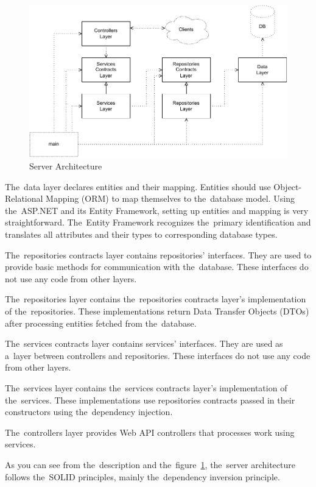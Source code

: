 \begin{figure}
    \centering
    \includegraphics[width=0.93\linewidth]{assets/design/serverarchitecture.pdf}
    \caption{Server Architecture}
    \label{fig:design:serverarchitecture}
\end{figure}

The~data layer declares entities and their mapping.
Entities should use Object-Relational Mapping (ORM) to map themselves to the~database model.
Using the~ASP.NET and its Entity Framework, setting up entities and mapping is very straightforward.
The~Entity Framework recognizes the~primary identification and translates all attributes and their types to corresponding database types.

The~repositories contracts layer contains repositories' interfaces.
They are used to provide basic methods for communication with the~database.
These interfaces do not use any code from other layers.

The~repositories layer contains the~repositories contracts layer's implementation of the~repositories.
These implementations return Data Transfer Objects (DTOs) after processing entities fetched from the~database.

The~services contracts layer contains services' interfaces.
They are used as a~layer between controllers and repositories.
These interfaces do not use any code from other layers.

The~services layer contains the~services contracts layer's implementation of the~services.
These implementations use repositories contracts passed in their constructors using the~dependency injection.

The~controllers layer provides Web API controllers that processes work using services.

As you can see from the~description and the~figure~\ref{fig:design:serverarchitecture}, the~server architecture follows the~SOLID principles, mainly the~dependency inversion principle.

